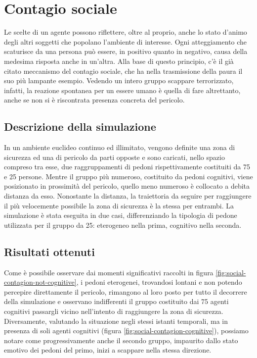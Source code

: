 \section{Contagio sociale}
Le scelte di un agente possono riflettere, oltre al proprio, anche lo stato d'animo degli altri soggetti che popolano l'ambiente di interesse. Ogni atteggiamento che scaturisce da una persona può essere, in positivo quanto in negativo, causa della medesima risposta anche in un'altra. \newline
Alla base di questo principio, c'è il già citato meccanismo del contagio sociale, che ha nella trasmissione della paura il suo più lampante esempio. Vedendo un intero gruppo scappare terrorizzato, infatti, la reazione spontanea per un essere umano è quella di fare altrettanto, anche se non si è riscontrata presenza concreta del pericolo.

\subsection{Descrizione della simulazione}
In un ambiente euclideo continuo ed illimitato, vengono definite una zona di sicurezza ed una di pericolo da parti opposte e sono caricati, nello spazio compreso tra esse, due raggruppamenti di pedoni rispettivamente costituiti da 75 e 25 persone. \newline 
Mentre il gruppo più numeroso, costituito da pedoni cognitivi, viene posizionato in prossimità del pericolo, quello meno numeroso è collocato a debita distanza da esso. Nonostante la distanza, la traiettoria da seguire per raggiungere il più velocemente possibile la zona di sicurezza è la stessa per entrambi. \newline
La simulazione è stata eseguita in due casi, differenziando la tipologia di pedone utilizzata per il gruppo da 25: eterogeneo nella prima, cognitivo nella seconda.

\subsection{Risultati ottenuti}
Come è possibile osservare dai momenti significativi raccolti in figura \ref{fig:social-contagion-not-cognitive}, i pedoni eterogenei, trovandosi lontani e non potendo percepire direttamente il pericolo, rimangono al loro posto per tutto il decorrere della simulazione e osservano indifferenti il gruppo costituito dai 75 agenti cognitivi passargli vicino nell'intento di raggiungere la zona di sicurezza. \newline
Diversamente, valutando la situazione negli stessi istanti temporali, ma in presenza di soli agenti cognitivi (figura \ref{fig:social-contagion-cognitive}), possiamo notare come progressivamente anche il secondo gruppo, impaurito dallo stato emotivo dei pedoni del primo, inizi a scappare nella stessa direzione. 

